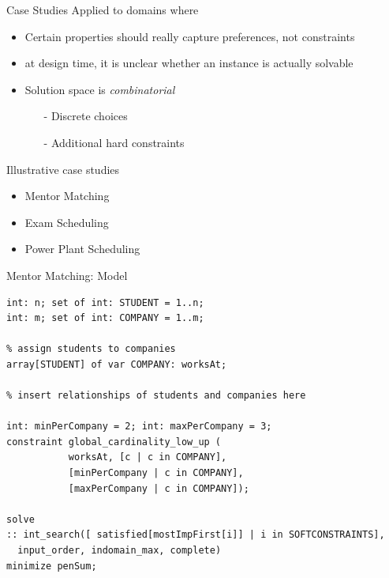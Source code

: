 \documentclass[handout,10pt,xcolor={dvipsnames},fleqn]{beamer}
\begin{document}
\begin{frame}{Case Studies}
Applied to domains where 
\begin{itemize}
\item Certain properties should really capture \alert{preferences}, not constraints
\item at design time, it is \alert{unclear} whether an instance is actually solvable
\item Solution space is \emph{combinatorial}
\begin{itemize}
\item[-] Discrete choices
\item[-] Additional hard constraints
\end{itemize}
\end{itemize}

\vspace*{2ex}

Illustrative case studies 
\begin{itemize}
\item Mentor Matching
\item Exam Scheduling
\item Power Plant Scheduling
\end{itemize}
\end{frame}

\begin{frame}[fragile]{Mentor Matching: Model}
\begin{lstlisting}
int: n; set of int: STUDENT = 1..n;
int: m; set of int: COMPANY = 1..m;

% assign students to companies
array[STUDENT] of var COMPANY: worksAt;

% insert relationships of students and companies here

int: minPerCompany = 2; int: maxPerCompany = 3;
constraint global_cardinality_low_up ( 
           worksAt, [c | c in COMPANY], 
           [minPerCompany | c in COMPANY], 
           [maxPerCompany | c in COMPANY]); 
           
solve 
:: int_search([ satisfied[mostImpFirst[i]] | i in SOFTCONSTRAINTS], 
  input_order, indomain_max, complete)
minimize penSum;
\end{lstlisting}
\end{frame}
\end{document}
